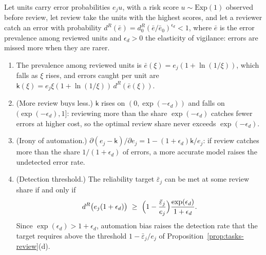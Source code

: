 \begin{proposition}\label{prop:tasks-bias}
Let units carry error probabilities $e_ju$, with a risk score $u\sim\mathrm{Exp}(1)$ observed before review, let review take the units with the highest scores, and let a reviewer catch an error with probability $d^R(\bar e)=d^R_0(\bar e/\bar e_0)^{\epsilon_d}<1$, where $\bar e$ is the error prevalence among reviewed units and $\epsilon_d>0$ the elasticity of vigilance: errors are missed more when they are rarer.
\begin{enumerate}
\item[(a)] The prevalence among reviewed units is $\bar e(\xi)=e_j(1+\ln(1/\xi))$, which falls as $\xi$ rises, and errors caught per unit are $\mathsf k(\xi)=e_j\xi(1+\ln(1/\xi))\,d^R(\bar e(\xi))$.
\item[(b)] (More review buys less.) $\mathsf k$ rises on $(0,\exp(-\epsilon_d))$ and falls on $(\exp(-\epsilon_d),1]$: reviewing more than the share $\exp(-\epsilon_d)$ catches fewer errors at higher cost, so the optimal review share never exceeds $\exp(-\epsilon_d)$.
\item[(c)] (Irony of automation.) $\partial(e_j-\mathsf k)/\partial e_j=1-(1+\epsilon_d)\mathsf k/e_j$: if review catches more than the share $1/(1+\epsilon_d)$ of errors, a more accurate model raises the undetected error rate.
\item[(d)] (Detection threshold.) The reliability target $\bar\varepsilon_j$ can be met at some review share if and only if
\[
d^R\bigl(e_j(1+\epsilon_d)\bigr)\ \ge\ \Bigl(1-\frac{\bar\varepsilon_j}{e_j}\Bigr)\frac{\exp(\epsilon_d)}{1+\epsilon_d}.
\]
Since $\exp(\epsilon_d)>1+\epsilon_d$, automation bias raises the detection rate that the target requires above the threshold $1-\bar\varepsilon_j/e_j$ of Proposition~\ref{prop:tasks-review}(d).
\end{enumerate}
\end{proposition}

